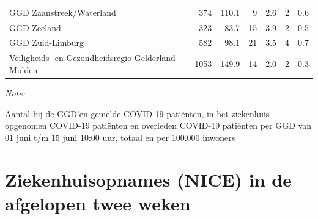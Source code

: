 \documentclass[
  english,
  man,floatsintext]{apa6}
\begin{document}
\begin{table}
\begin{threeparttable}
\begin{tabular}{lrrrrrr}
GGD Zaanstreek/Waterland & 374 & 110.1 & 9 & 2.6 & 2 & 0.6\\
GGD Zeeland & 323 & 83.7 & 15 & 3.9 & 2 & 0.5\\
GGD Zuid-Limburg & 582 & 98.1 & 21 & 3.5 & 4 & 0.7\\
Veiligheids- en Gezondheidsregio Gelderland-Midden & 1053 & 149.9 & 14 & 2.0 & 2 & 0.3\\
\bottomrule
\end{tabular}
\begin{tablenotes}
\item \textit{Note: } 
\item Aantal bij de GGD’en gemelde COVID-19 patiënten, in het ziekenhuis opgenomen COVID-19 patiënten en overleden COVID-19 patiënten per GGD van 01 juni t/m 15 juni 10:00 uur, totaal en per 100.000 inwoners
\end{tablenotes}
\end{threeparttable}
\endgroup{}
\end{table}

\newpage

\hypertarget{ziekenhuisopnames-nice-in-de-afgelopen-twee-weken}{%
\section{Ziekenhuisopnames (NICE) in de afgelopen twee weken}\label{ziekenhuisopnames-nice-in-de-afgelopen-twee-weken}}
\end{document}
